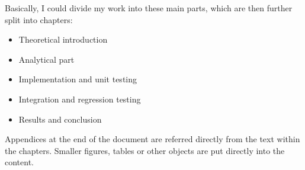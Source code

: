 \begin{introduction}
	Basically, I could divide my work into these main parts, which are then further split into chapters:
	
	\begin{itemize}
	  \item Theoretical introduction
	  \item Analytical part
	  \item Implementation and unit testing
	  \item Integration and regression testing
	  \item Results and conclusion
	\end{itemize}
	
	Appendices at the end of the document are referred directly from the text within the chapters. Smaller figures, tables
	or other objects are put directly into the content.
	 
\end{introduction}